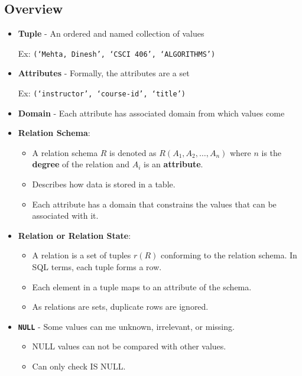 \documentclass{../cheatsheet}
\begin{document}
\begin{multicols*}{2}
    \section{Overview}
    \begin{itemize}
        \item \textbf{Tuple} -
            An ordered and named collection of values

            Ex: \texttt{(`Mehta, Dinesh', `CSCI 406', `ALGORITHMS')}
        \item \textbf{Attributes} - 
            Formally, the attributes are a set

            Ex: \texttt{(`instructor', `course-id', `title')}
        \item \textbf{Domain} -
            Each attribute has associated domain from which
            values come
        \item \textbf{Relation Schema}:
            \begin{itemize}
                \item A relation schema $R$ is denoted as $R(A_1,
                    A_2,\dots,A_n)$ where $n$ is the \textbf{degree} of the 
                    relation and $A_i$ is an \textbf{attribute}.
                \item Describes how data is stored in a table.
                \item Each attribute has a domain that constrains the values
                    that can be associated with it.
            \end{itemize}

        \item \textbf{Relation or Relation State}:
            \begin{itemize}
                \item A relation is a set of tuples $r(R)$ conforming to the
                    relation schema. In SQL terms, each tuple forms a row.
                \item Each element in a tuple maps to an attribute of the schema.
                \item As relations are sets, duplicate rows are ignored.
            \end{itemize}

        \item \textbf{\texttt{NULL}} -
            Some values can me unknown, irrelevant, or missing.
            \begin{itemize}
                \item NULL values can not be compared with other values.
                \item Can only check IS NULL.
            \end{itemize}


\end{itemize}
\end{multicols*}
\end{document}
